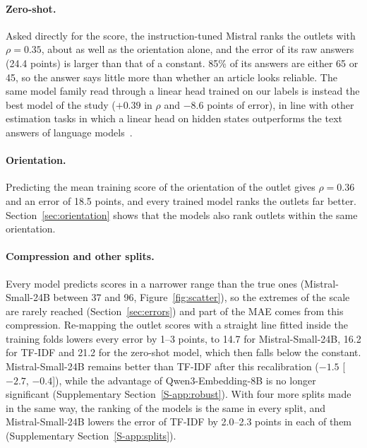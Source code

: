 \documentclass[11pt,a4paper]{article}
\begin{document}
\paragraph{Zero-shot.} Asked directly for the score, the instruction-tuned Mistral ranks the outlets with
$\rho = 0.35$, about as well as the orientation alone, and the error of its raw answers (24.4 points) is larger than
that of a constant. 85\% of its answers are either 65 or 45, so the answer says little more than whether an article
looks reliable. The same model family read through a linear head trained on our labels is instead the best model of the
study ($+0.39$ in $\rho$ and $-8.6$ points of error), in line with other estimation tasks in which a linear head on
hidden states outperforms the text answers of language models~\cite{buckmann2025revealing}.

\paragraph{Orientation.} Predicting the mean training score of the orientation of the outlet gives $\rho = 0.36$ and an
error of 18.5 points, and every trained model ranks the outlets far better. Section~\ref{sec:orientation} shows that the
models also rank outlets within the same orientation.

\paragraph{Compression and other splits.} Every model predicts scores in a narrower range than the true ones
(Mistral-Small-24B between 37 and 96, Figure~\ref{fig:scatter}), so the extremes of the scale are rarely reached
(Section~\ref{sec:errors}) and part of the MAE comes from this compression. Re-mapping the outlet scores with a straight
line fitted inside the training folds lowers every error by 1--3 points, to 14.7 for Mistral-Small-24B, 16.2 for TF-IDF
and 21.2 for the zero-shot model, which then falls below the constant. Mistral-Small-24B remains better than TF-IDF after
this recalibration ($-1.5$ [$-2.7$, $-0.4$]), while the advantage of Qwen3-Embedding-8B is no longer significant
(Supplementary Section~\ref{S-app:robust}). With four more splits made in the same way, the ranking of the models is the
same in every split, and Mistral-Small-24B lowers the error of TF-IDF by 2.0--2.3 points in each of them (Supplementary
Section~\ref{S-app:splits}).
\end{document}
